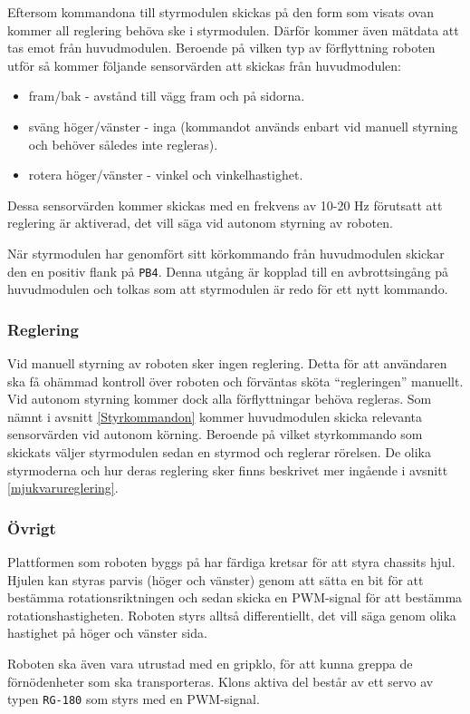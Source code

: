 \documentclass[11pt]{article}
\begin{document}
\begin{flushleft}
Eftersom kommandona till styrmodulen skickas på den form som visats ovan kommer all reglering behöva ske i styrmodulen. Därför kommer även mätdata att tas emot från huvudmodulen. Beroende på vilken typ av förflyttning roboten utför så kommer följande sensorvärden att skickas från huvudmodulen:
\begin{itemize}
	\item fram/bak - avstånd till vägg fram och på sidorna.
	\item sväng höger/vänster - inga (kommandot används enbart vid manuell styrning och behöver således inte regleras).
	\item rotera höger/vänster - vinkel och vinkelhastighet.
\end{itemize}
Dessa sensorvärden kommer skickas med en frekvens av 10-20 Hz förutsatt att reglering är aktiverad, det vill säga vid autonom styrning av roboten.

När styrmodulen har genomfört sitt körkommando från huvudmodulen skickar den en positiv flank på \verb+PB4+. Denna utgång är kopplad till en avbrottsingång på huvudmodulen och tolkas som att styrmodulen är redo för ett nytt kommando. 

\subsubsection{Reglering}
Vid manuell styrning av roboten sker ingen reglering. Detta för att användaren ska få ohämmad kontroll över roboten och förväntas sköta ``regleringen'' manuellt. Vid autonom styrning kommer dock alla förflyttningar behöva regleras. Som nämnt i avsnitt \ref{Styrkommandon} kommer huvudmodulen skicka relevanta sensorvärden vid autonom körning. Beroende på vilket styrkommando som skickats väljer styrmodulen sedan en styrmod och reglerar rörelsen. De olika styrmoderna och hur deras reglering sker finns beskrivet mer ingående i avsnitt \ref{mjukvarureglering}.

\subsubsection{Övrigt}
Plattformen som roboten byggs på har färdiga kretsar för att styra chassits hjul. Hjulen kan styras parvis (höger och vänster) genom att sätta en bit för att bestämma rotationsriktningen och sedan skicka en PWM-signal för att bestämma rotationshastigheten. Roboten styrs alltså differentiellt, det vill säga genom olika hastighet på höger och vänster sida.

Roboten ska även vara utrustad med en gripklo, för att kunna greppa de förnödenheter som ska transporteras. Klons aktiva del består av ett servo av typen \verb+RG-180+ som styrs med en PWM-signal.


\end{flushleft}
\end{document}
